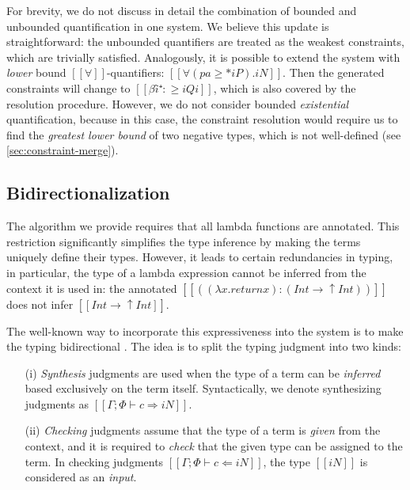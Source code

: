 For brevity, we do not discuss in detail the combination of bounded and
unbounded quantification in one system. We believe this update is straightforward:
the unbounded quantifiers are treated as the weakest constraints, which are trivially
satisfied. Analogously, it is possible to extend the system with \emph{lower}
bound $[[∀]]$-quantifiers: $[[∀(pa ≥* iP). iN]]$. 
Then the generated constraints will change to $[[βî⁺ :≥ iQi]]$, which 
is also covered by the resolution procedure.
However, we do not consider bounded \emph{existential} quantification,
because in this case, the constraint resolution would require us to 
find the \emph{greatest lower bound} of two negative types, which is not
well-defined (see \cref{sec:constraint-merge}).

\subsection{Bidirectionalization}






The algorithm we provide requires that all lambda functions are annotated. 
This restriction significantly simplifies the type inference by making the 
terms uniquely define their types. However, it leads to certain redundancies
in typing, in particular, the type of a lambda expression cannot be inferred 
from the context it is used in: the annotated $[[((λ x . return x) : (Int → ↑Int))]]$
does not infer $[[Int → ↑Int]]$.

The well-known way to incorporate this expressiveness into the system
is to make the typing bidirectional \cite{dunfield2020:bidirectional}.
The idea is to split the typing judgment into two kinds:
\begin{enumerate}
    \item[(i)] \emph{Synthesis} 
        judgments are used when the type of a term can be \emph{inferred}
        based exclusively on the term itself. 
        Syntactically, we denote synthesizing judgments
        as $[[Γ ; Φ ⊢ c ⇒ iN]]$.
    \item[(ii)] \emph{Checking} judgments 
        assume that the type of a term is \emph{given}
        from the context, and 
        it is required to \emph{check} that the given
        type can be assigned to the term.
        In checking judgments $[[Γ ; Φ ⊢ c ⇐ iN]]$, 
        the type $[[iN]]$ is considered as an \emph{input}.
\end{enumerate}

